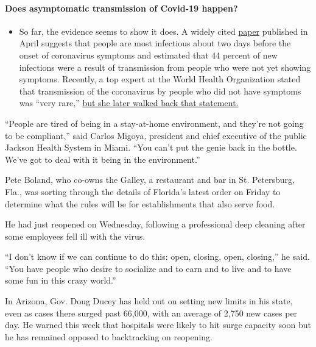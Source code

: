 \begin{itemize}
{  \paragraph{Does asymptomatic transmission of Covid-19
  happen?}\label{does-asymptomatic-transmission-of-covid-19-happen}}

  \begin{itemize}
  \tightlist
  \item
    So far, the evidence seems to show it does. A widely cited
    \href{https://www.nature.com/articles/s41591-020-0869-5}{paper}
    published in April suggests that people are most infectious about
    two days before the onset of coronavirus symptoms and estimated that
    44 percent of new infections were a result of transmission from
    people who were not yet showing symptoms. Recently, a top expert at
    the World Health Organization stated that transmission of the
    coronavirus by people who did not have symptoms was ``very rare,''
    \href{https://www.nytimes.com/2020/06/09/world/coronavirus-updates.html?action=click\&pgtype=Article\&state=default\&region=MAIN_CONTENT_3\&context=storylines_faq\#link-1f302e21}{but
    she later walked back that statement.}
  \end{itemize}
\end{itemize}

``People are tired of being in a stay-at-home environment, and they're
not going to be compliant,'' said Carlos Migoya, president and chief
executive of the public Jackson Health System in Miami. ``You can't put
the genie back in the bottle. We've got to deal with it being in the
environment.''

Pete Boland, who co-owns the Galley, a restaurant and bar in St.
Petersburg, Fla., was sorting through the details of Florida's latest
order on Friday to determine what the rules will be for establishments
that also serve food.

He had just reopened on Wednesday, following a professional deep
cleaning after some employees fell ill with the virus.

``I don't know if we can continue to do this: open, closing, open,
closing,'' he said. ``You have people who desire to socialize and to
earn and to live and to have some fun in this crazy world.''

In Arizona, Gov. Doug Ducey has held out on setting new limits in his
state, even as cases there surged past 66,000, with an average of 2,750
new cases per day. He warned this week that hospitals were likely to hit
surge capacity soon but he has remained opposed to backtracking on
reopening.

